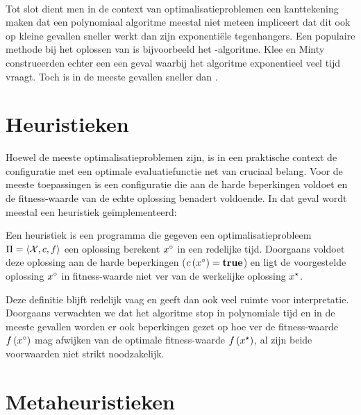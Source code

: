 \paragraph{}
Tot slot dient men in de context van optimalisatieproblemen een kanttekening maken dat een polynomiaal algoritme meestal niet meteen impliceert dat dit ook op kleine gevallen sneller werkt dan zijn exponenti\"ele tegenhangers. Een populaire methode bij het oplossen van  is bijvoorbeeld het -algoritme. Klee en Minty\cite{klee:1972} construeerden echter een een geval waarbij het algoritme exponentieel veel tijd vraagt. Toch is  in de meeste gevallen sneller dan .

\section{Heuristieken}

Hoewel de meeste optimalisatieproblemen  zijn, is in een praktische context de configuratie met een optimale evaluatiefunctie net van cruciaal belang. Voor de meeste toepassingen is een configuratie die aan de harde beperkingen voldoet en de fitness-waarde van de echte oplossing benadert voldoende. In dat geval wordt meestal een heuristiek ge\"implementeerd:

\begin{definition}[Heuristiek]
Een heuristiek is een programma die gegeven een optimalisatieprobleem $\Pi=\left\langle \mathcal{X},c,f\right\rangle$ een oplossing berekent $x^{\circ}$ in een redelijke tijd. Doorgaans voldoet deze oplossing aan de harde beperkingen ($c\left(x^{\circ}\right)=\mbox{\textbf{true}}$) en ligt de voorgestelde oplossing $x^{\circ}$ in fitness-waarde niet ver van de werkelijke oplossing $x^{\star}$.
\end{definition}

Deze definitie blijft redelijk vaag en geeft dan ook veel ruimte voor interpretatie. Doorgaans verwachten we dat het algoritme stop in polynomiale tijd en in de meeste gevallen worden er ook beperkingen gezet op hoe ver de fitness-waarde $f\left(x^{\circ}\right)$ mag afwijken van de optimale fitness-waarde $f\left(x^{\star}\right)$, al zijn beide voorwaarden niet strikt noodzakelijk.


\section{Metaheuristieken}

